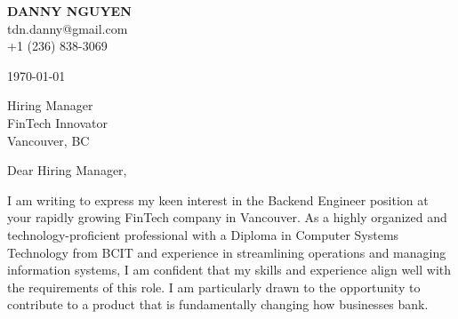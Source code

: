 \documentclass[letterpaper,11pt]{article}
\begin{document}
\textbf{DANNY NGUYEN} \\
tdn.danny@gmail.com \\
+1 (236) 838-3069 \\
\vspace{20pt}

\today \\
\vspace{20pt}

Hiring Manager \\
FinTech Innovator \\
Vancouver, BC \\
\vspace{20pt}

Dear Hiring Manager, \\
\vspace{10pt}

I am writing to express my keen interest in the Backend Engineer position at your rapidly growing FinTech company in Vancouver. As a highly organized and technology-proficient professional with a Diploma in Computer Systems Technology from BCIT and experience in streamlining operations and managing information systems, I am confident that my skills and experience align well with the requirements of this role. I am particularly drawn to the opportunity to contribute to a product that is fundamentally changing how businesses bank.
\vspace{10pt}
\end{document}
